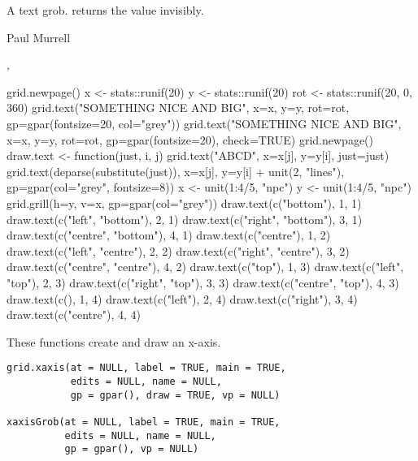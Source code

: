 %
\begin{Value}
A text grob.   returns the value invisibly.
\end{Value}
%
\begin{Author}\relax
Paul Murrell
\end{Author}
%
\begin{SeeAlso}\relax
{},
\end{SeeAlso}
%
\begin{Examples}
\begin{ExampleCode}
grid.newpage()
x <- stats::runif(20)
y <- stats::runif(20)
rot <- stats::runif(20, 0, 360)
grid.text("SOMETHING NICE AND BIG", x=x, y=y, rot=rot,
          gp=gpar(fontsize=20, col="grey"))
grid.text("SOMETHING NICE AND BIG", x=x, y=y, rot=rot,
          gp=gpar(fontsize=20), check=TRUE)
grid.newpage()
draw.text <- function(just, i, j) {
  grid.text("ABCD", x=x[j], y=y[i], just=just)
  grid.text(deparse(substitute(just)), x=x[j], y=y[i] + unit(2, "lines"),
            gp=gpar(col="grey", fontsize=8))
}
x <- unit(1:4/5, "npc")
y <- unit(1:4/5, "npc")
grid.grill(h=y, v=x, gp=gpar(col="grey"))
draw.text(c("bottom"), 1, 1)
draw.text(c("left", "bottom"), 2, 1)
draw.text(c("right", "bottom"), 3, 1)
draw.text(c("centre", "bottom"), 4, 1)
draw.text(c("centre"), 1, 2)
draw.text(c("left", "centre"), 2, 2)
draw.text(c("right", "centre"), 3, 2)
draw.text(c("centre", "centre"), 4, 2)
draw.text(c("top"), 1, 3)
draw.text(c("left", "top"), 2, 3)
draw.text(c("right", "top"), 3, 3)
draw.text(c("centre", "top"), 4, 3)
draw.text(c(), 1, 4)
draw.text(c("left"), 2, 4)
draw.text(c("right"), 3, 4)
draw.text(c("centre"), 4, 4)
\end{ExampleCode}
\end{Examples}
%
\begin{Description}\relax
These functions create and draw an x-axis.
\end{Description}
%
\begin{Usage}
\begin{verbatim}
grid.xaxis(at = NULL, label = TRUE, main = TRUE,
           edits = NULL, name = NULL,
           gp = gpar(), draw = TRUE, vp = NULL)

xaxisGrob(at = NULL, label = TRUE, main = TRUE,
          edits = NULL, name = NULL,
          gp = gpar(), vp = NULL)
\end{verbatim}
\end{Usage}
